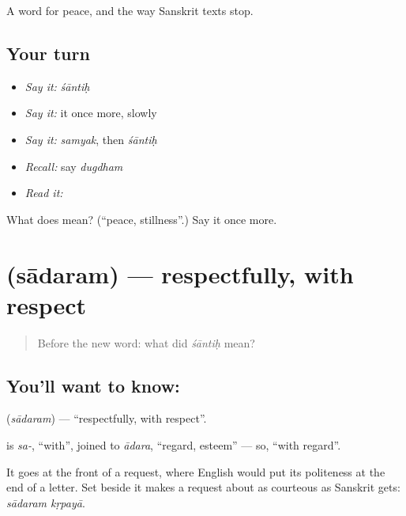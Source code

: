 \begin{grammarlens}[title={What you've built}]
A word for peace, and the way Sanskrit texts stop.
\end{grammarlens}

\subsection*{Your turn}
\begin{itemize}
\raggedright
  \item \emph{Say it:} \emph{śāntiḥ}
  \item \emph{Say it:} it once more, slowly
  \item \emph{Say it:} \emph{samyak}, then \emph{śāntiḥ}
  \item \emph{Recall:} say \emph{dugdham}
  \item \emph{Read it:} \textbf{}
\end{itemize}

\begin{tcolorbox}[breakable,colback=teal!4,colframe=teal!35!black,title={Before you move on}]
What does  mean? (\textquotedblleft{}peace, stillness\textquotedblright{}.) Say it once more.
\end{tcolorbox}
\section[\texorpdfstring{\sk{सादरम्} (sādaram)}{सादरम् (sādaram)}]{ (sādaram) — respectfully, with respect}

\label{lesson:SA-C37-respectfully}



\begin{quote}
Before the new word: what did \emph{śāntiḥ} mean?
\end{quote}

\subsection*{You'll want to know: }
\textbf{} (\emph{sādaram}) — \textquotedblleft{}respectfully, with respect\textquotedblright{}.

\textbf{} is \emph{sa-}, \textquotedblleft{}with\textquotedblright{}, joined to \emph{ādara}, \textquotedblleft{}regard, esteem\textquotedblright{} — so, \textquotedblleft{}with regard\textquotedblright{}.

It goes at the front of a request, where English would put its politeness at the end of a letter. Set beside \textbf{} it makes a request about as courteous as Sanskrit gets: \emph{sādaram kṛpayā}.

